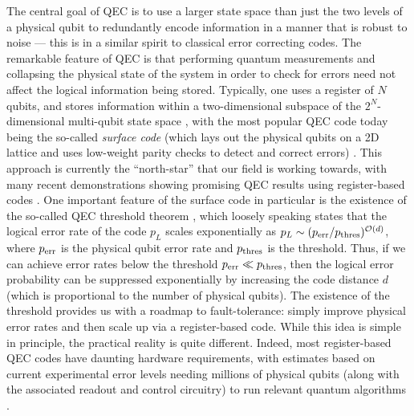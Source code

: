 The central goal of QEC is to use a larger state space than just the two levels of a physical qubit to redundantly encode information in a manner that is robust to noise --- this is in a similar spirit to classical error correcting codes.
The remarkable feature of QEC is that performing quantum measurements and collapsing the physical state of the system in order to check for errors need not affect the logical information being stored. Typically, one uses a register of $N$ qubits, and stores information within a two-dimensional subspace of the $2^N$-dimensional multi-qubit state space \cite{shor1995scheme, steane1996error, gottesman1996class, kitaev2003fault, fowler2012surface}, with the most popular QEC code today being the so-called \textit{surface code} (which lays out the physical qubits on a 2D lattice and uses low-weight parity checks to detect and correct errors) \cite{fowler2012surface}. This approach is currently the ``north-star'' that our field is working towards, with many recent demonstrations showing promising QEC results using register-based codes \cite{google2023suppressing, bluvstein2024logical, campbell2024series}. One important feature of the surface code in particular is the existence of the so-called QEC threshold theorem \cite{aharonov1997fault,knill1998resilient}, which loosely speaking states that the logical error rate of the code $p_L$ scales exponentially as $p_L \sim (p_{\rm err}/p_{\rm thres})^{\mathcal{O}(d)}$, where $p_{\rm err}$ is the physical qubit error rate and $p_{\rm thres}$ is the threshold. Thus, if we can achieve error rates below the threshold $p_{\rm err} \ll p_{\rm thres}$, then the logical error probability can be suppressed exponentially by increasing the code distance $d$ (which is proportional to the number of physical qubits). The existence of the threshold provides us with a roadmap to fault-tolerance: simply improve physical error rates and then scale up via a register-based code. While this idea is simple in principle, the practical reality is quite different. Indeed, most register-based QEC codes have daunting hardware requirements, with estimates based on current experimental error levels needing millions of physical qubits (along with the associated readout and control circuitry) to run relevant quantum algorithms \cite{gidney2021factor}. 

